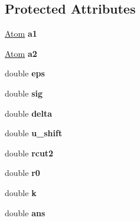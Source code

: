 \subsection*{Protected Attributes}
\begin{DoxyCompactItemize}
\item 
\hypertarget{classAtomEnergy_a90a47ff4e593c93121c50eaa67d5cad0}{\hyperlink{structatom_1_1Atom}{Atom} {\bfseries a1}}\label{classAtomEnergy_a90a47ff4e593c93121c50eaa67d5cad0}

\item 
\hypertarget{classAtomEnergy_a2ed136df1c0b9595afc2e194ddf417d8}{\hyperlink{structatom_1_1Atom}{Atom} {\bfseries a2}}\label{classAtomEnergy_a2ed136df1c0b9595afc2e194ddf417d8}

\item 
\hypertarget{classAtomEnergy_ac33666ab9666e81bf974ef84cd8c45bf}{double {\bfseries eps}}\label{classAtomEnergy_ac33666ab9666e81bf974ef84cd8c45bf}

\item 
\hypertarget{classAtomEnergy_a697045927feafd05f5b857bb3d09ebf4}{double {\bfseries sig}}\label{classAtomEnergy_a697045927feafd05f5b857bb3d09ebf4}

\item 
\hypertarget{classAtomEnergy_ac92e7b970296f8b5c60b146e8c6ce338}{double {\bfseries delta}}\label{classAtomEnergy_ac92e7b970296f8b5c60b146e8c6ce338}

\item 
\hypertarget{classAtomEnergy_a817bb4649b2033c35b42181de22ee029}{double {\bfseries u\-\_\-shift}}\label{classAtomEnergy_a817bb4649b2033c35b42181de22ee029}

\item 
\hypertarget{classAtomEnergy_ac1530f722d77d1ba30151b818608820c}{double {\bfseries rcut2}}\label{classAtomEnergy_ac1530f722d77d1ba30151b818608820c}

\item 
\hypertarget{classAtomEnergy_afa221d08bb12f3c13995def894b30964}{double {\bfseries r0}}\label{classAtomEnergy_afa221d08bb12f3c13995def894b30964}

\item 
\hypertarget{classAtomEnergy_af22f75932949668164b74f85a8508e58}{double {\bfseries k}}\label{classAtomEnergy_af22f75932949668164b74f85a8508e58}

\item 
\hypertarget{classAtomEnergy_a9c1c937c8e29863de28dfdca6f4ce58d}{double {\bfseries ans}}\label{classAtomEnergy_a9c1c937c8e29863de28dfdca6f4ce58d}


\end{DoxyCompactItemize}
